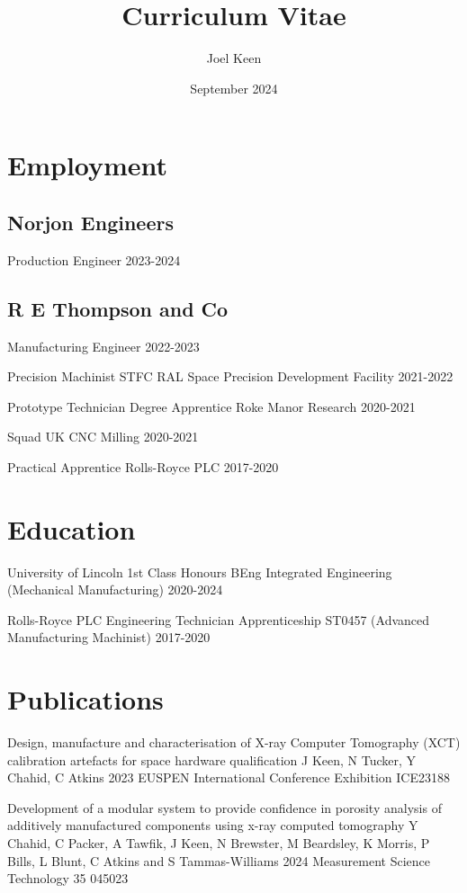 \documentclass{cv}
\title{Curriculum Vitae}
\author{Joel Keen}
\date{September 2024}
\begin{document}
\maketitle

\section{Employment}

\subsection{Norjon Engineers}

Production Engineer 2023-2024

\subsection{R E Thompson and Co}

Manufacturing Engineer 2022-2023

Precision Machinist STFC RAL Space Precision Development Facility 2021-2022

Prototype Technician Degree Apprentice Roke Manor Research 2020-2021

Squad UK CNC Milling 2020-2021

Practical Apprentice Rolls-Royce PLC 2017-2020

\section{Education}
University of Lincoln 1st Class Honours BEng Integrated Engineering (Mechanical Manufacturing) 2020-2024 

Rolls-Royce PLC Engineering Technician Apprenticeship ST0457 (Advanced Manufacturing Machinist) 2017-2020

\section{Publications}

Design, manufacture and characterisation of X-ray Computer Tomography (XCT)
calibration artefacts for space hardware qualification J Keen, N Tucker, Y Chahid, C Atkins 2023 EUSPEN International Conference Exhibition ICE23188

Development of a modular system to provide confidence in porosity analysis of additively manufactured components using x-ray computed tomography Y Chahid, C Packer, A Tawfik, J Keen, N Brewster, M Beardsley, K Morris, P Bills, L Blunt, C Atkins and S Tammas-Williams 2024 Measurement Science Technology 35 045023
\end{document}
